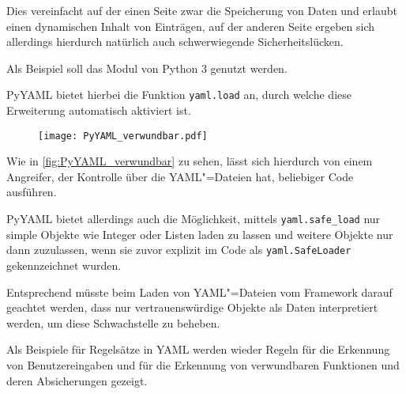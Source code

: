                 Dies vereinfacht auf der einen Seite zwar die Speicherung von Daten und
                erlaubt einen dynamischen Inhalt von Einträgen,
                auf der anderen Seite ergeben sich allerdings hierdurch natürlich auch schwerwiegende Sicherheitslücken.

                Als Beispiel soll das Modul
                 von Python 3 genutzt werden.

                PyYAML bietet hierbei die Funktion
                \lstinline{yaml.load} an,
                durch welche diese Erweiterung automatisch aktiviert ist.

                \begin{figure}[htp]
                    \centering%
                    \texttt{[image: PyYAML\_verwundbar.pdf]}
                    \label{fig:PyYAML_verwundbar}
                \end{figure}

                Wie in
                \vref{fig:PyYAML_verwundbar} zu sehen,
                lässt sich hierdurch von einem Angreifer,
                der Kontrolle über die
                \gls{YAML}"=Dateien hat,
                beliebiger Code ausführen.

                PyYAML bietet allerdings auch die Möglichkeit,
                mittels
                \lstinline{yaml.safe_load} nur simple Objekte
                wie Integer oder
                Listen laden zu lassen und
                weitere Objekte nur dann zuzulassen,
                wenn sie zuvor explizit im Code als
                \lstinline{yaml.SafeLoader} gekennzeichnet wurden.\cite{Net2018}

                Entsprechend müsste beim Laden von
                \gls{YAML}"=Dateien vom Framework darauf geachtet werden,
                dass nur vertrauenswürdige Objekte als Daten interpretiert werden,
                um diese Schwachstelle zu beheben.

                Als Beispiele für Regelsätze in
                \gls{YAML} werden wieder Regeln für die Erkennung von Benutzereingaben und
                für die Erkennung von verwundbaren Funktionen und
                deren Absicherungen gezeigt.

                

